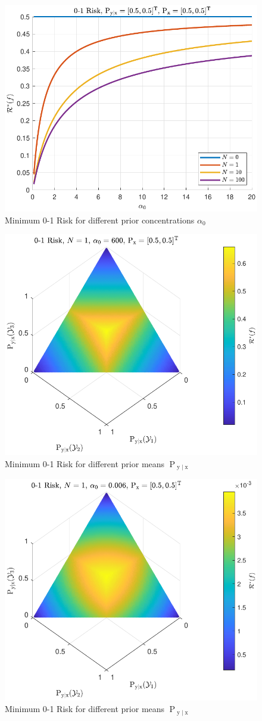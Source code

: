 \documentclass[12pt]{report}
\DeclareMathOperator{\xrm}{\mathrm{x}}
\DeclareMathOperator{\yrm}{\mathrm{y}}
\DeclareMathOperator{\Prm}{\mathrm{P}}
\begin{document}
\begin{figure}
\centering
\includegraphics[width=0.7\linewidth]{Risk_01_Dir_a0_leg_N.pdf}
\caption{Minimum 0-1 Risk for different prior concentrations $\alpha_0$}
\label{fig:Risk_01_Dir_a0_leg_N}
\end{figure}

\begin{figure}
\centering
\includegraphics[width=0.7\linewidth]{Risk_01_Dir_Pyx__a0_high.pdf}
\caption{Minimum 0-1 Risk for different prior means $\Prm_{\yrm | \xrm}$}
\label{fig:Risk_01_Dir_Pyx__a0_high}
\end{figure}

\begin{figure}
\centering
\includegraphics[width=0.7\linewidth]{Risk_01_Dir_Pyx__a0_low.pdf}
\caption{Minimum 0-1 Risk for different prior means $\Prm_{\yrm | \xrm}$}
\label{fig:Risk_01_Dir_Pyx__a0_low}
\end{figure}
\end{document}
